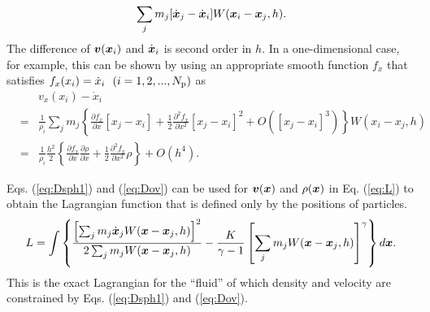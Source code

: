 \documentclass{cjour}
\newcommand{ \Vec   }[1]{ \mbox{\boldmath $ #1 $} }
\newcommand{ \PD    }[2]{ \frac{ \partial #1 }{ \partial #2 } }
\begin{document}
\begin{article}
\begin{equation}
                \sum_{j} m_{j} [ \dot{\Vec{x}}_j - \dot{\Vec{x}}_i ]
                              W(\Vec{x}_i - \Vec{x}_{j} , h ) . 
                                                     \label{eq:XSPH}
\end{equation}
The difference of $\Vec{v}(\Vec{x}_i)$ and $\dot{\Vec{x}}_i$ is 
second order in $h$.  
In a one-dimensional case, for example, this can be shown 
by using an appropriate smooth function $f_x$ that satisfies 
$ f_x(x_i) = \dot{x}_i ~~(i=1,2,..., N_{\rm p})$ as 
%
%
\begin{eqnarray}
       &   & v_x (x_i) - \dot{x}_i 
                                                         \nonumber \\
       & = & 
                \frac{1}{\rho_i}
                \sum_{j} m_{j} 
          \left\{               \PD{   f_x}{x  }  [ x_j - x_i ]
                  + \frac{1}{2} \PD{^2 f_x}{x^2}  [ x_j - x_i ]^2 
                                             + O( [ x_j - x_i ]^3 )
          \right\}
                         W( x_i - x_j, h ) 
                                                         \nonumber \\
       & = & 
                \frac{1}{\rho_i}
                \frac{h^2}{2}
          \left\{               \PD{   f_x}{x  } \PD{\rho}{x}
                  + \frac{1}{2} \PD{^2 f_x}{x^2}     \rho
          \right\}
                + O( h^4 ) . 
                                                     \label{eq:difvv}
\end{eqnarray}

Eqs. (\ref{eq:Dsph1}) and (\ref{eq:Dov}) can be used for 
$\Vec{v}(\Vec{x})$ and $\rho(\Vec{x})$ in Eq. (\ref{eq:L}) 
to obtain the Lagrangian function 
that is defined only by the positions of particles.  
\begin{equation}
        L = 
            \int \left\{ 
            \frac{ \left[\sum_{j} m_{j} \dot{ \Vec{x}}_j 
                         W(\Vec{x} - \Vec{x}_{j}, h ) \right]^2 }  
                 {2 \sum_{j} m_{j} W(\Vec{x} - \Vec{x}_{j}, h )} 
            - \frac{K}{\gamma -1}
                 \left[
                    \sum_{j} m_{j} W(\Vec{x} - \Vec{x}_{j},h )
                 \right]^{\gamma}
            \right\} d\Vec{x} . 
                                                  \label{eq:L1}
\end{equation}
This is the exact Lagrangian for the ``fluid'' of which 
density and velocity are constrained by 
Eqs. (\ref{eq:Dsph1}) and (\ref{eq:Dov}). 


\end{article}
\end{document}
